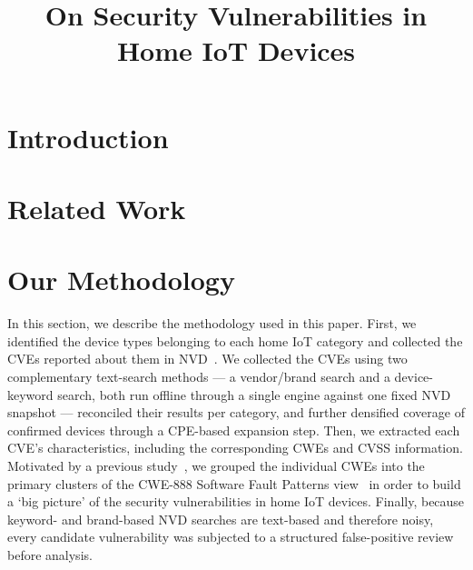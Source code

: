 \documentclass[conference]{IEEEtran}
\begin{document}
\title{On Security Vulnerabilities in Home IoT Devices}

\author{
}

\maketitle

\begin{abstract}

\end{abstract}

\begin{IEEEkeywords}

\end{IEEEkeywords}

\section{Introduction}
\label{sec:intro}


\section{Related Work}
\label{sec:related}


\section{Our Methodology}
\label{sec:method}

In this section, we describe the methodology used in this paper. First, we
identified the device types belonging to each home IoT category and collected
the CVEs reported about them in NVD~\cite{ref-nvd}. We collected the CVEs using
two complementary text-search methods --- a vendor/brand search and a
device-keyword search, both run offline through a single engine against one fixed
NVD snapshot --- reconciled their results per category, and further densified
coverage of confirmed devices through a CPE-based expansion step. Then, we extracted each
CVE's characteristics, including the corresponding CWEs and CVSS information.
Motivated by a previous study~\cite{ref-mcsoftware}, we grouped the individual
CWEs into the primary clusters of the CWE-888 Software Fault Patterns
view~\cite{ref-cwe888} in order to build a `big picture' of the security
vulnerabilities in home IoT devices. Finally, because keyword- and brand-based
NVD searches are text-based and therefore noisy, every candidate vulnerability
was subjected to a structured false-positive review before analysis.
\end{document}

